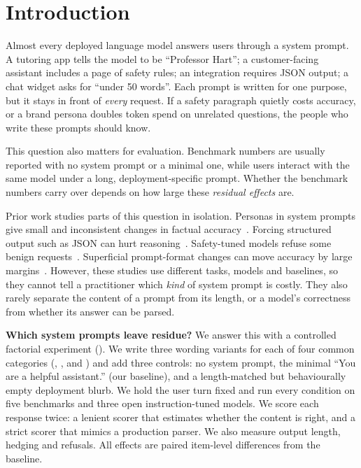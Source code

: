 \section{Introduction}
\label{sec:intro}

Almost every deployed language model answers users through a system prompt. A tutoring app tells the model to be ``Professor Hart''; a customer-facing assistant includes a page of safety rules; an integration requires JSON output; a chat widget asks for ``under 50 words''. Each prompt is written for one purpose, but it stays in front of {\em every} request. If a safety paragraph quietly costs accuracy, or a brand persona doubles token spend on unrelated questions, the people who write these prompts should know.

This question also matters for evaluation. Benchmark numbers are usually reported with no system prompt or a minimal one, while users interact with the same model under a long, deployment-specific prompt. Whether the benchmark numbers carry over depends on how large these {\em residual effects} are.

Prior work studies parts of this question in isolation. Personas in system prompts give small and inconsistent changes in factual accuracy~\cite{zheng2023helpful}. Forcing structured output such as JSON can hurt reasoning~\cite{tam2024speak}. Safety-tuned models refuse some benign requests~\cite{rottger2023xstest,cui2024orbench}. Superficial prompt-format changes can move accuracy by large margins~\cite{sclar2023quantifying}. However, these studies use different tasks, models and baselines, so they cannot tell a practitioner which {\em kind} of system prompt is costly. They also rarely separate the content of a prompt from its length, or a model's correctness from whether its answer can be parsed.

{\bf Which system prompts leave residue?} We answer this with a controlled factorial experiment (). We write three wording variants for each of four common categories (\safety, \persona, \format and \constraint) and add three controls: no system prompt, the minimal ``You are a helpful assistant.'' (our baseline), and a length-matched but behaviourally empty deployment blurb. We hold the user turn fixed and run every condition on five benchmarks and three open instruction-tuned models. We score each response twice: a lenient scorer that estimates whether the content is right, and a strict scorer that mimics a production parser. We also measure output length, hedging and refusals. All effects are paired item-level differences from the baseline.

